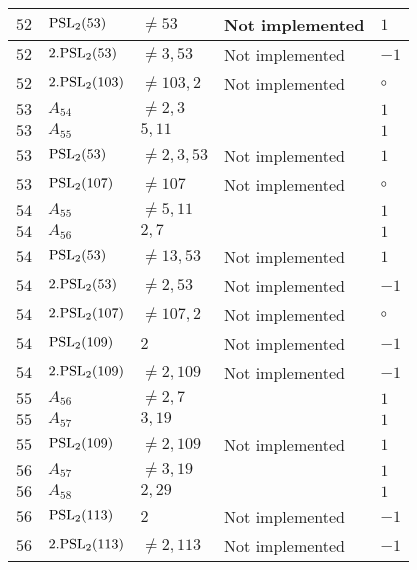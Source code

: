 \documentclass[a4paper, 11pt]{article}
\begin{document}
\begin{longtable}{lllll}
        $ 52 $ & $ {\rm PSL}_{2}(53) $ & $ \neq 53 $ & Not implemented & $ 1  $ \\ \hline
        $ 52 $ & $ 2.{\rm PSL}_{2}(53) $ & $ \neq 3, 53 $ & Not implemented & $ -1  $ \\ \hline
        $ 52 $ & $ 2.{\rm PSL}_{2}(103) $ & $ \neq 103, 2 $ & Not implemented & $\circ$ \\ \hline
        $ 53 $ & $ A_{54} $ & $ \neq 2, 3 $ & $ ~ $ & $ 1  $ \\ \hline
        $ 53 $ & $ A_{55} $ & $ 5, 11 $ & $ ~ $ & $ 1  $ \\ \hline
        $ 53 $ & $ {\rm PSL}_{2}(53) $ & $ \neq 2, 3, 53 $ & Not implemented & $ 1  $ \\ \hline
        $ 53 $ & $ {\rm PSL}_{2}(107) $ & $ \neq 107 $ & Not implemented & $\circ$ \\ \hline
        $ 54 $ & $ A_{55} $ & $ \neq 5, 11 $ & $ ~ $ & $ 1  $ \\ \hline
        $ 54 $ & $ A_{56} $ & $ 2, 7 $ & $ ~ $ & $ 1  $ \\ \hline
        $ 54 $ & $ {\rm PSL}_{2}(53) $ & $ \neq 13, 53 $ & Not implemented & $ 1  $ \\ \hline
        $ 54 $ & $ 2.{\rm PSL}_{2}(53) $ & $ \neq 2, 53 $ & Not implemented & $ -1  $ \\ \hline
        $ 54 $ & $ 2.{\rm PSL}_{2}(107) $ & $ \neq 107, 2 $ & Not implemented & $\circ$ \\ \hline
        $ 54 $ & $ {\rm PSL}_{2}(109) $ & $ 2 $ & Not implemented & $ -1  $ \\ \hline
        $ 54 $ & $ 2.{\rm PSL}_{2}(109) $ & $ \neq 2, 109 $ & Not implemented & $ -1  $ \\ \hline
        $ 55 $ & $ A_{56} $ & $ \neq 2, 7 $ & $ ~ $ & $ 1  $ \\ \hline
        $ 55 $ & $ A_{57} $ & $ 3, 19 $ & $ ~ $ & $ 1  $ \\ \hline
        $ 55 $ & $ {\rm PSL}_{2}(109) $ & $ \neq 2, 109 $ & Not implemented & $ 1  $ \\ \hline
        $ 56 $ & $ A_{57} $ & $ \neq 3, 19 $ & $ ~ $ & $ 1  $ \\ \hline
        $ 56 $ & $ A_{58} $ & $ 2, 29 $ & $ ~ $ & $ 1  $ \\ \hline
        $ 56 $ & $ {\rm PSL}_{2}(113) $ & $ 2 $ & Not implemented & $ -1  $ \\ \hline
        $ 56 $ & $ 2.{\rm PSL}_{2}(113) $ & $ \neq 2, 113 $ & Not implemented & $ -1  $ \\ \hline

\end{longtable}
\end{document}
